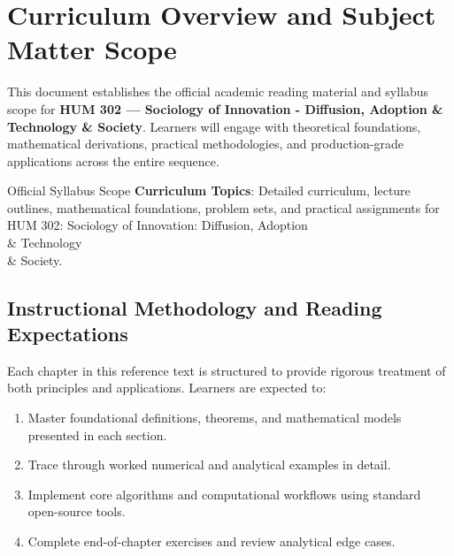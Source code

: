 \section{Curriculum Overview and Subject Matter Scope}

This document establishes the official academic reading material and syllabus scope for \textbf{HUM 302 --- Sociology of Innovation - Diffusion, Adoption \& Technology \& Society}. Learners will engage with theoretical foundations, mathematical derivations, practical methodologies, and production-grade applications across the entire sequence.

\begin{InsightBox}{Official Syllabus Scope}
  \textbf{Curriculum Topics}: Detailed curriculum, lecture outlines, mathematical foundations, problem sets, and practical assignments for HUM 302: Sociology of Innovation: Diffusion, Adoption \\& Technology \\& Society.
\end{InsightBox}

\subsection{Instructional Methodology and Reading Expectations}

Each chapter in this reference text is structured to provide rigorous treatment of both principles and applications. Learners are expected to:
\begin{enumerate}
  \item Master foundational definitions, theorems, and mathematical models presented in each section.
  \item Trace through worked numerical and analytical examples in detail.
  \item Implement core algorithms and computational workflows using standard open-source tools.
  \item Complete end-of-chapter exercises and review analytical edge cases.
\end{enumerate}

